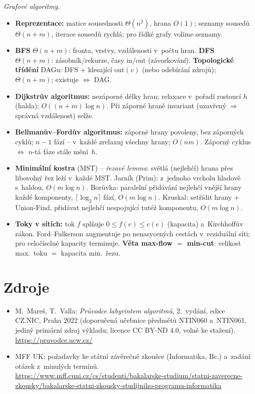 \documentclass[11pt,a4paper]{article}
\begin{document}
\begin{poznamka}
\smallskip
\emph{Grafové algoritmy.}
\begin{itemize}
  \item \textbf{Reprezentace:} matice sousednosti $\Theta(n^2)$, hrana $O(1)$; seznamy sousedů $\Theta(n+m)$, iterace sousedů rychlá; pro řídké grafy volíme seznamy.
  \item \textbf{BFS} $\Theta(n+m)$: fronta, vrstvy, vzdálenosti v~počtu hran. \textbf{DFS} $\Theta(n+m)$: zásobník/rekurze, časy $\mathrm{in}/\mathrm{out}$ (závorkování). \textbf{Topologické třídění} DAGu: DFS + klesající $\mathrm{out}(v)$ (nebo odebírání zdrojů); $\Theta(n+m)$; existuje $\Leftrightarrow$ DAG.
  \item \textbf{Dijkstrův algoritmus:} nezáporné délky hran; relaxace v~pořadí rostoucí $h$ (halda); $O((n+m)\log n)$. Při záporné hraně invariant (uzavřený $\Rightarrow$ správná vzdálenost) selže.
  \item \textbf{Bellmanův--Fordův algoritmus:} záporné hrany povoleny, bez záporných cyklů; $n-1$ fází -- v~každé zrelaxuj všechny hrany; $O(nm)$. Záporný cyklus $\Leftrightarrow$ $n$-tá fáze stále mění~$h$.
  \item \textbf{Minimální kostra} (MST) -- \emph{řezové lemma}: světlá (nejlehčí) hrana přes libovolný řez leží v~každé MST. Jarník (Prim): z~jednoho vrcholu hladově s~haldou, $O(m\log n)$. Borůvka: paralelní přidávání nejlehčí vnější hrany každé komponenty, $\lceil\log_2 n\rceil$ fází, $O(m\log n)$. Kruskal: setřídit hrany + Union-Find, přidávat nejlehčí nespojující tutéž komponentu, $O(m\log n)$.
  \item \textbf{Toky v sítích:} tok $f$ splňuje $0\le f(e)\le c(e)$ (kapacita) a~Kirchhoffův zákon. Ford--Fulkerson augmentuje po nenasycených cestách v~reziduální síti; pro celočíselné kapacity terminuje. \textbf{Věta max-flow $=$ min-cut}: velikost max.\ toku $=$ kapacita min.\ řezu.
\end{itemize}
\end{poznamka}

\section*{Zdroje}

{\raggedright
\begin{itemize}
  \item M.~Mareš, T.~Valla: \emph{Průvodce labyrintem algoritmů}, 2.~vydání, edice CZ.NIC, Praha 2022 (doporučená učebnice předmětů NTIN060 a~NTIN061, jediný primární zdroj výkladu; licence CC BY-ND 4.0, volně ke stažení).\\ \url{https://pruvodce.ucw.cz/}
  \item MFF UK: požadavky ke státní závěrečné zkoušce (Informatika, Bc.) a~zadání otázek z~minulých termínů.\\ \url{https://www.mff.cuni.cz/cs/studenti/bakalarske-studium/statni-zaverecne-zkousky/bakalarske-statni-zkousky-studijniho-programu-informatika}
\end{itemize}
\par}
\end{document}
